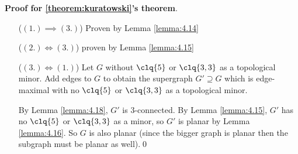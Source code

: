 \begin{prf}
    \textbf{Proof for \ref{theorem:kuratowski}'s theorem}.

    \begin{itemize}
        \item[($(1.) \implies (3.)$)] Proven by Lemma \ref{lemma:4.14}
        \item[($(2.) \iff (3.)$)] proven by Lemma \ref{lemma:4.15}
        \item[($(3.) \iff (1.)$)] Let $G$ without $\clq{5}$ or $\clq{3, 3}$ as a topological minor. Add edges to $G$ to obtain the supergraph $G' \supseteq G$ which is edge-maximal with no $\clq{5}$ or $\clq{3, 3}$ as a topological minor.
        
        By Lemma \ref{lemma:4.18}, $G'$ is $3$-connected. By Lemma \ref{lemma:4.15}, $G'$ has no $\clq{5}$ or $\clq{3, 3}$ as a minor, so $G'$ is planar by Lemma \ref{lemma:4.16}. So $G$ is also planar (since the bigger graph is planar then the subgraph must be planar as well).\qed
    \end{itemize}
\end{prf}